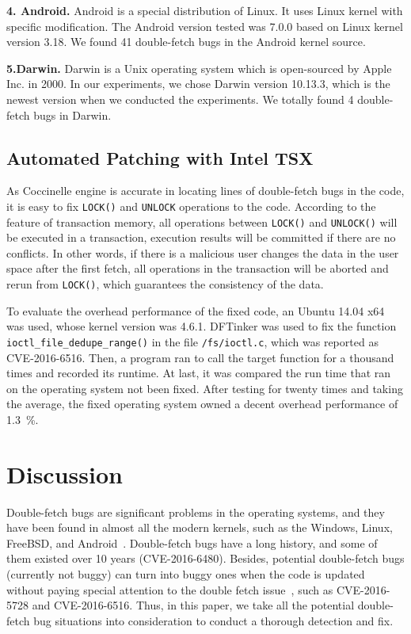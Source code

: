 \documentclass[10pt]{llncs}
\begin{document}
\textbf{4. Android.}
Android is a special distribution of Linux. It uses Linux kernel with specific modification. The Android version tested was 7.0.0 based on Linux kernel version 3.18. We found 41 double-fetch bugs in the Android kernel source.

\textbf{5.Darwin.}
Darwin is a Unix operating system which is open-sourced by Apple Inc. in 2000. In our experiments, we chose Darwin version 10.13.3, which is the newest version when we conducted the experiments. We totally found 4 double-fetch bugs in Darwin.

\subsection{Automated Patching with Intel TSX}
\label{evalue2}

As Coccinelle engine is accurate in locating lines of double-fetch bugs in the code, it is easy to fix \verb:LOCK(): and \verb:UNLOCK: operations to the code. According to the feature of transaction memory, all operations between \verb:LOCK(): and \verb:UNLOCK(): will be executed in a transaction, execution results will be committed if there are no conflicts. In other words, if there is a malicious user changes the data in the user space after the first fetch, all operations in the transaction will be aborted and rerun from \verb:LOCK():, which guarantees the consistency of the data.

To evaluate the overhead performance of the fixed code, an Ubuntu 14.04 x64 was used, whose kernel version was 4.6.1. DFTinker was used to fix the function \verb:ioctl_file_dedupe_range(): in the file \verb:/fs/ioctl.c:, which was reported as CVE-2016-6516. Then, a program ran to call the target function for a thousand times and recorded its runtime. At last, it was compared the run time that ran on the operating system not been fixed. After testing for twenty times and taking the average, the fixed operating system owned a decent overhead performance of 1.3~\%.

\section{Discussion}%
\label{discuss}

Double-fetch bugs are significant problems in the operating systems, and they have been found in almost all the modern kernels, such as the Windows, Linux, FreeBSD, and Android~\cite{wang}. Double-fetch bugs have a long history, and some of them existed over 10 years (CVE-2016-6480). Besides, potential double-fetch bugs (currently not buggy) can turn into buggy ones when the code is updated without paying special attention to the double fetch issue~\cite{wang}, such as CVE-2016-5728 and CVE-2016-6516. Thus, in this paper, we take all the potential double-fetch bug situations into consideration to conduct a thorough detection and fix.
\end{document}
